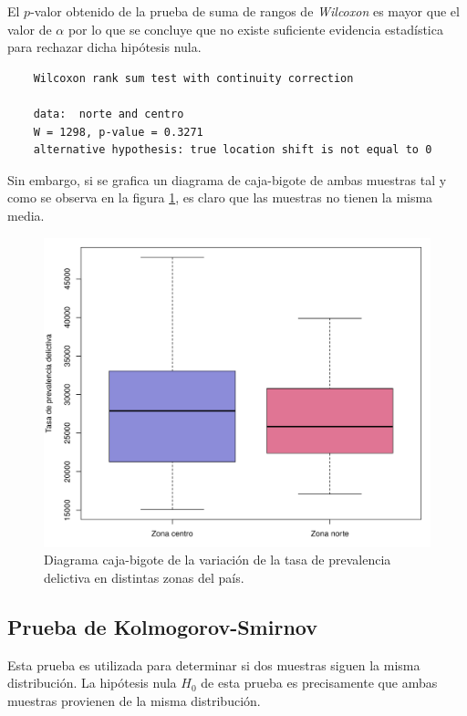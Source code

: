 \documentclass[12pt]{article}
\begin{document}
	El $p$-valor obtenido de la prueba de suma de rangos de {\em Wilcoxon} es mayor que el valor de $\alpha$ por lo que se concluye que no existe suficiente evidencia estadística para rechazar dicha hipótesis nula.
	\begin{verbatim}
	Wilcoxon rank sum test with continuity correction

	data:  norte and centro
	W = 1298, p-value = 0.3271
	alternative hypothesis: true location shift is not equal to 0
	\end{verbatim} 
	
	Sin embargo, si se grafica un diagrama de caja-bigote de ambas muestras tal y como se observa en la figura \ref{boxplot-zonas}, es claro que las muestras no tienen la misma media.
	
	\begin{figure}
		\centering
		\includegraphics[scale=0.5]{boxplot_norte-centro.png}
		\caption{Diagrama caja-bigote de la variación de la tasa de prevalencia delictiva en distintas zonas del país.}
		\label{boxplot-zonas}
	\end{figure}

	\subsection{Prueba de Kolmogorov-Smirnov}
	
	Esta prueba es utilizada para determinar si dos muestras siguen la misma distribución. La hipótesis nula $H_0$ de esta prueba es precisamente que ambas muestras provienen de la misma distribución.
	
\end{document}
